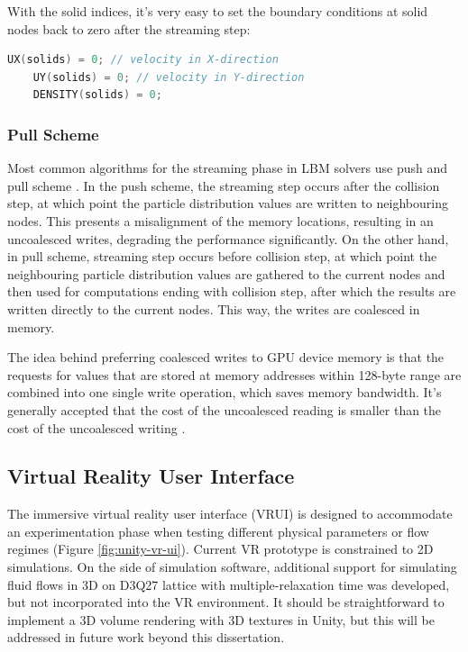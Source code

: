 With the solid indices, it's very easy to set the boundary conditions at solid nodes back to zero after the streaming step:

\begin{lstlisting}[language=Cpp, caption=Pseudocode for boundary conditions at solid nodes.]
	UX(solids) = 0; // velocity in X-direction
	UY(solids) = 0; // velocity in Y-direction
	DENSITY(solids) = 0;
\end{lstlisting}

\subsubsection{Pull Scheme}

Most common algorithms for the streaming phase in LBM solvers use push and pull scheme \cite{tranPerformanceOptimization3D2017, herschlagGPUDataAccess2018}. In the push scheme, the streaming step occurs after the collision step, at which point the particle distribution values are written to neighbouring nodes. This presents a misalignment of the memory locations, resulting in an uncoalesced writes, degrading the performance significantly. On the other hand, in pull scheme, streaming step occurs before collision step, at which point the neighbouring particle distribution values are gathered to the current nodes and then used for computations ending with collision step, after which the results are written directly to the current nodes. This way, the writes are coalesced in memory.

The idea behind preferring coalesced writes to GPU device memory is that the requests for values that are stored at memory addresses within 128-byte range are combined into one single write operation, which saves memory bandwidth. It's generally accepted that the cost of the uncoalesced reading is smaller than the cost of the uncoalesced writing \cite{tranPerformanceOptimization3D2017}.

\subsection{Virtual Reality User Interface}\label{sec:vrui}
The immersive virtual reality user interface (VRUI) is designed to accommodate an experimentation phase when testing different physical parameters or flow regimes (Figure \ref{fig:unity-vr-ui}). Current VR prototype is constrained to 2D simulations. On the side of simulation software, additional support for simulating fluid flows in 3D on D3Q27 lattice with multiple-relaxation time was developed, but not incorporated into the VR environment. It should be straightforward to implement a 3D volume rendering with 3D textures in Unity, but this will be addressed in future work beyond this dissertation.

